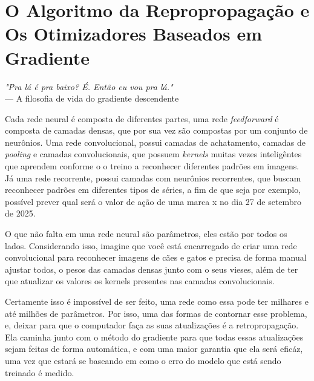 
\chapter{O Algoritmo da Repropropagação e Os Otimizadores Baseados em Gradiente}
\label{cap:retropropagacao-gradiente}

\begin{flushright}
\textit{"Pra lá é pra baixo? É. Então eu vou pra lá."} \\
--- A filosofia de vida do gradiente descendente
\end{flushright}


Cada rede neural é composta de diferentes partes, uma rede \textit{feedforward} é composta de camadas densas, que por sua vez são compostas por um conjunto de neurônios. Uma rede convolucional, possui camadas de achatamento, camadas de \textit{pooling} e camadas convolucionais, que possuem \textit{kernels} muitas vezes inteligêntes que aprendem conforme o o treino a reconhecer diferentes padrões em imagens. Já uma rede recorrente, possui camadas com neurônios recorrentes, que buscam reconhecer padrões em diferentes tipos de séries, a fim de que seja por exemplo, possível prever qual será o valor de ação de uma marca x no dia 27 de setembro de 2025.

O que não falta em uma rede neural são parâmetros, eles estão por todos os lados. Considerando isso, imagine que você está encarregado de criar uma rede convolucional para reconhecer imagens de cães e gatos e precisa de forma manual ajustar todos, o pesos das camadas densas junto com o seus vieses, além de ter que atualizar os valores os kernels presentes nas camadas convolucionais.

Certamente isso é impossível de ser feito, uma rede como essa pode ter milhares e até milhões de parâmetros. Por isso, uma das formas de contornar esse problema, e, deixar para que o computador faça as suas atualizações é a retropropagação. Ela caminha junto com o método do gradiente para que todas essas atualizações sejam feitas de forma automática, e com uma maior garantia que ela será eficáz, uma vez que estará se baseando em como o erro do modelo que está sendo treinado é medido.

